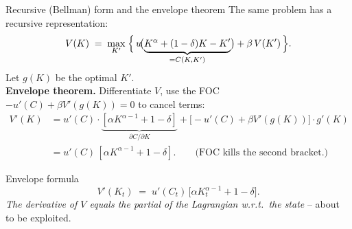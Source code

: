 \documentclass[aspectratio=169,11pt]{beamer}
\begin{document}
\begin{frame}{Recursive (Bellman) form and the envelope theorem}
\footnotesize The same problem has a recursive representation:
\[
V(K) \;=\; \max_{K'}\; \Bigl\{\, u\!\bigl(\underbrace{K^\alpha + (1-\delta)K - K'}_{= C(K,K')}\bigr) + \beta\, V(K') \,\Bigr\}.
\]
Let $g(K)$ be the optimal $K'$.\\[2pt]
\textbf{Envelope theorem.} Differentiate $V$, use the FOC $-u'(C) + \beta V'(g(K)) = 0$ to cancel terms:
\begin{align*}
V'(K) &= u'\!(C)\cdot\underbrace{[\alpha K^{\alpha-1} + 1 - \delta]}_{\partial C / \partial K} + \bigl[-u'(C) + \beta V'(g(K))\bigr]\cdot g'(K)\\
&= u'(C)\,[\alpha K^{\alpha-1} + 1 - \delta]. \qquad\text{(FOC kills the second bracket.)}
\end{align*}
\begin{alertblock}{Envelope formula}
\footnotesize
\[
V'(K_t) \;=\; u'(C_t)\,\bigl[\alpha K_t^{\alpha-1} + 1 - \delta\bigr].
\]
\emph{The derivative of $V$ equals the partial of the Lagrangian w.r.t.\ the state} -- about to be exploited.
\end{alertblock}
\end{frame}
\end{document}
